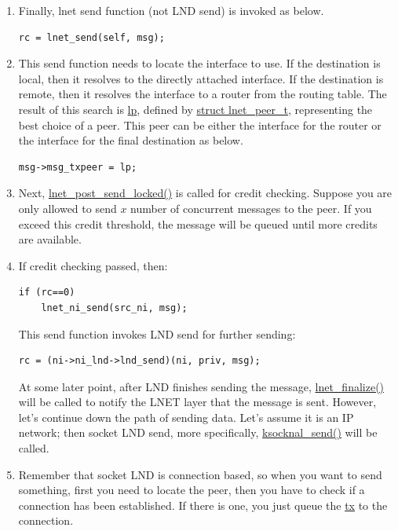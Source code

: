 \begin{enumerate}
\item Finally, lnet send function (not LND send) is invoked as below.

\begin{Verbatim}
rc = lnet_send(self, msg);
\end{Verbatim}

\item This send function needs to locate the interface to use. If the
destination is local, then it resolves to the directly attached interface. If
the destination is remote, then it resolves the interface to a router from the
routing table.  The result of this search is \url{lp}, defined by \url{struct
lnet_peer_t}, representing the best choice of a peer. This peer can be either
the interface for the router or the interface for the final destination as
below.

\begin{Verbatim}
msg->msg_txpeer = lp;
\end{Verbatim}

\item Next, \url{lnet_post_send_locked()} is called for credit checking.
Suppose you are only allowed to send $x$ number of concurrent messages to the
peer. If you exceed this credit threshold, the message will be queued until
more credits are available.

\item If credit checking passed, then:

\begin{Verbatim}
if (rc==0)
    lnet_ni_send(src_ni, msg);
\end{Verbatim}

This send function invokes LND send for further sending:

\begin{Verbatim}
rc = (ni->ni_lnd->lnd_send)(ni, priv, msg);
\end{Verbatim}

At some later point, after LND finishes sending the message,
\url{lnet_finalize()} will be called to notify the LNET layer that the message
is sent. However, let's continue down the path of sending data. Let's assume it
is an IP network; then socket LND send, more specifically,
\url{ksocknal_send()} will be called. 

\item Remember that socket LND is connection based, so when you want to send
something, first you need to locate the peer, then you have to check if a
connection has been established. If there is one, you just queue the \url{tx}
to the connection.


\end{enumerate}
